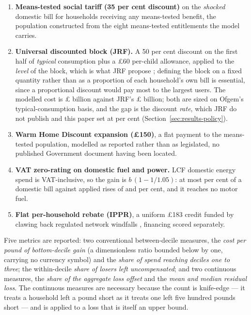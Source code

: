 \begin{enumerate}\setlength{\itemsep}{1pt}
\item \textbf{Means-tested social tariff (35 per cent discount)} on the \emph{shocked} domestic bill for households receiving any means-tested benefit, the population constructed from the eight means-tested entitlements the model carries.
\item \textbf{Universal discounted block (JRF).} A 50 per cent discount on the first half of \emph{typical} consumption plus a \pounds 60 per-child allowance, applied to the \emph{level} of the block, which is what JRF propose \citep{jrf2026}; defining the block on a fixed quantity rather than as a proportion of each household's own bill is essential, since a proportional discount would pay most to the largest users. The modelled cost is \pounds \genJrfGapModelledBn{} billion against JRF's \pounds \genJrfGapSponsorBn{} billion; both are sized on Ofgem's typical-consumption basis, and the gap is the discount \emph{rate}, which JRF do not publish and this paper set at \genJrfModelledDiscountPct{} per cent (Section~\ref{sec:results-policy}).
\item \textbf{Warm Home Discount expansion (\pounds 150)}, a flat payment to the means-tested population, modelled as reported rather than as legislated, no published Government document having been located.
\item \textbf{VAT zero-rating on domestic fuel and power.} LCF domestic energy spend is VAT-inclusive, so the gain is $b\,(1 - 1/1.05)$: at most \genVatCutMaxOffsetPct{} per cent of a domestic bill against applied rises of \genAppliedGasUnitRatePct{} and \genAppliedElecUnitRatePct{} per cent, and it reaches no motor fuel.
\item \textbf{Flat per-household rebate (IPPR)}, a uniform \pounds 183 credit funded by clawing back regulated network windfalls \citep{ippr2026}, financing scored separately.
\end{enumerate}

Five metrics are reported: two conventional between-decile measures, the \emph{cost per pound of bottom-decile gain} (a dimensionless ratio bounded below by one, carrying no currency symbol) and the \emph{share of spend reaching deciles one to three}; the within-decile \emph{share of losers left uncompensated}; and two continuous measures, the \emph{share of the aggregate loss offset} and the \emph{mean and median residual loss}. The continuous measures are necessary because the count is knife-edge --- it treats a household left a pound short as it treats one left five hundred pounds short --- and is applied to a loss that is itself an upper bound.

